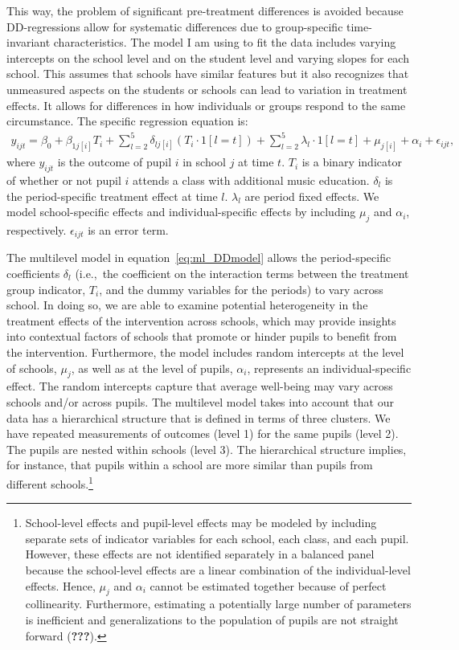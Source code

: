\documentclass[a4, 12pt]{article}
\let\rmarkdownfootnote\footnote%
\def\footnote{\protect\rmarkdownfootnote}
\begin{document}
This way, the problem of significant pre-treatment differences is avoided because DD-regressions allow for systematic differences due to group-specific time-invariant characteristics.
The model I am using to fit the data includes varying intercepts on the school level and on the student level and varying slopes for each school. This assumes that schools have similar features but it also recognizes that unmeasured aspects on the students or schools can lead to variation in treatment effects. It allows for differences in how individuals or groups respond to the same circumstance. The specific regression equation is:
\begin{align}\label{eq:ml_DDmodel}
y_{ijt} = \beta_0 + \beta_{1j[i]} T_i + \sum\limits_{l=2}^5\delta_{lj[i]} (T_{i} \cdot 1[l=t]) + \sum\limits_{l=2}^5\lambda_l\cdot 1[l=t] + \mu_{j[i]} + \alpha_{i} + \epsilon_{ijt},
\end{align}
where \(y_{ijt}\) is the outcome of pupil \(i\) in school \(j\) at time \(t\). \(T_{i}\) is a binary indicator of whether or not pupil \(i\) attends a class with additional music education. \(\delta_l\) is the period-specific treatment effect at time \(l\). \(\lambda_l\) are period fixed effects. We model school-specific effects and individual-specific effects by including \(\mu_{j}\) and \(\alpha_{i}\), respectively. \(\epsilon_{ijt}\) is an error term.

The multilevel model in equation~\ref{eq:ml_DDmodel} allows the period-specific coefficients \(\delta_l\) (i.e.,~the coefficient on the interaction terms between the treatment group indicator, \(T_i\), and the dummy variables for the periods) to vary across school. In doing so, we are able to examine potential heterogeneity in the treatment effects of the intervention across schools, which may provide insights into contextual factors of schools that promote or hinder pupils to benefit from the intervention. Furthermore, the model includes random intercepts at the level of schools, \(\mu_j\), as well as at the level of pupils, \(\alpha_{i}\), represents an individual-specific effect. The random intercepts capture that average well-being may vary across schools and/or across pupils. The multilevel model takes into account that our data has a hierarchical structure that is defined in terms of three clusters. We have repeated measurements of outcomes (level 1) for the same pupils (level 2). The pupils are nested within schools (level 3). The hierarchical structure implies, for instance, that pupils within a school are more similar than pupils from different schools.\footnote{School-level effects and pupil-level effects may be modeled by including separate sets of indicator variables for each school, each class, and each pupil. However, these effects are not identified separately in a balanced panel because the school-level effects are a linear combination of the individual-level effects. Hence, \(\mu_j\) and \(\alpha_{i}\) cannot be estimated together because of perfect collinearity. Furthermore, estimating a potentially large number of parameters is inefficient and generalizations to the population of pupils are not straight forward ({\textbf{???}}).}
\end{document}
